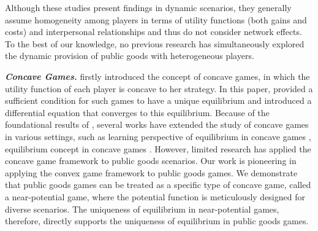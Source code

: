 Although these studies present findings in dynamic scenarios, they generally assume homogeneity among players in terms of utility functions (both gains and costs) and interpersonal relationships and thus do not consider network effects. To the best of our knowledge, no previous research has simultaneously explored the dynamic provision of public goods with heterogeneous players.

\emph{\bf Concave Games.}
\citet{concave_game-initial:rosen1965existence}
firstly introduced the concept of concave games, in which the utility function of each player is concave to her strategy. In this paper, \citet{concave_game-initial:rosen1965existence} provided a sufficient condition for such games to have a unique equilibrium and introduced a differential equation that converges to this equilibrium. 
Because of the foundational results of \citet{concave_game-initial:rosen1965existence}, several works have extended the study of concave games in various settings, such as learning perspective of equilibrium in concave games \citep{concave_game-learning:nesterov2009primal, concave_game-learning:mertikopoulos2019learning, concave_game-learning:bravo2018bandit}, equilibrium concept in concave games \citep{concave_game-concept:forgo1994existence, concave_game-concept:ui2008correlated, concave_game-concept:goktas2021convex}.
However, limited research has applied the concave game framework to public goods scenarios. Our work is pioneering in applying the convex game framework to public goods games. We demonstrate that public goods games can be treated as a specific type of concave game, called a near-potential game, where the potential function is meticulously designed for diverse scenarios. The uniqueness of equilibrium in near-potential games, therefore, directly supports the uniqueness of equilibrium in public goods games.




